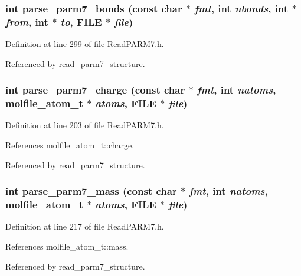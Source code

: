 \subsubsection{\setlength{\rightskip}{0pt plus 5cm}int parse\_\-parm7\_\-bonds (const char $\ast$ {\em fmt}, int {\em nbonds}, int $\ast$ {\em from}, int $\ast$ {\em to}, FILE $\ast$ {\em file})\hspace{0.3cm}{\tt  [static]}}\label{ReadPARM7_8h_a12}




Definition at line 299 of file Read\-PARM7.h.

Referenced by read\_\-parm7\_\-structure.
\subsubsection{\setlength{\rightskip}{0pt plus 5cm}int parse\_\-parm7\_\-charge (const char $\ast$ {\em fmt}, int {\em natoms}, {\bf molfile\_\-atom\_\-t} $\ast$ {\em atoms}, FILE $\ast$ {\em file})\hspace{0.3cm}{\tt  [static]}}\label{ReadPARM7_8h_a7}




Definition at line 203 of file Read\-PARM7.h.

References molfile\_\-atom\_\-t::charge.

Referenced by read\_\-parm7\_\-structure.
\subsubsection{\setlength{\rightskip}{0pt plus 5cm}int parse\_\-parm7\_\-mass (const char $\ast$ {\em fmt}, int {\em natoms}, {\bf molfile\_\-atom\_\-t} $\ast$ {\em atoms}, FILE $\ast$ {\em file})\hspace{0.3cm}{\tt  [static]}}\label{ReadPARM7_8h_a8}




Definition at line 217 of file Read\-PARM7.h.

References molfile\_\-atom\_\-t::mass.

Referenced by read\_\-parm7\_\-structure.
